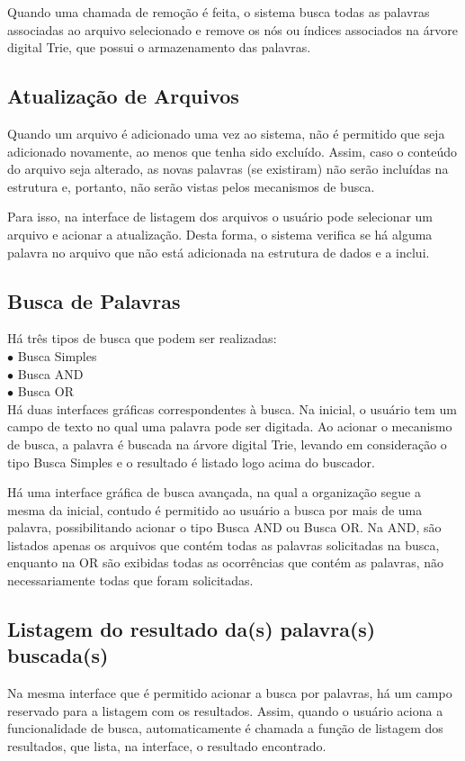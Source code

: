 \documentclass[12pt]{article}
\begin{document}
	Quando uma chamada de remoção é feita, o sistema busca todas as palavras associadas ao arquivo selecionado e remove os nós ou índices associados na árvore digital Trie, que possui o armazenamento das palavras.

\subsection{Atualização de Arquivos}
Quando um arquivo é adicionado uma vez ao sistema, não é permitido que seja adicionado novamente, ao menos que tenha sido excluído. Assim, caso o conteúdo do arquivo seja alterado, as novas palavras (se existiram) não serão incluídas na estrutura e, portanto, não serão vistas pelos mecanismos de busca.

	Para isso, na interface de listagem dos arquivos o usuário pode selecionar um arquivo e acionar a atualização. Desta forma, o sistema verifica se há alguma palavra no arquivo que não está adicionada na estrutura de dados e a inclui.

\subsection{Busca de Palavras}
Há três tipos de busca que podem ser realizadas: \\
$\bullet$ Busca Simples\\
$\bullet$ Busca AND\\
$\bullet$ Busca OR\\

Há duas interfaces gráficas correspondentes à busca. Na inicial, o usuário tem um campo de texto no qual uma palavra pode ser digitada. Ao acionar o mecanismo de busca, a palavra é buscada na árvore digital Trie, levando em consideração o tipo Busca Simples e o resultado é listado logo acima do buscador.

Há uma interface gráfica de busca avançada, na qual a organização segue a mesma da inicial, contudo é permitido ao usuário a busca por mais de uma palavra, possibilitando acionar o tipo Busca AND ou Busca OR. Na AND, são listados apenas os arquivos que contém todas as palavras solicitadas na busca, enquanto na OR são exibidas todas as ocorrências que contém as palavras, não necessariamente todas que foram solicitadas.

\subsection{Listagem do resultado da(s) palavra(s) buscada(s)}
Na mesma interface que é permitido acionar a busca por palavras, há um campo reservado para a listagem com os resultados. Assim, quando o usuário aciona a funcionalidade de busca, automaticamente é chamada a função de listagem dos resultados, que lista, na interface, o resultado encontrado.
\end{document}

